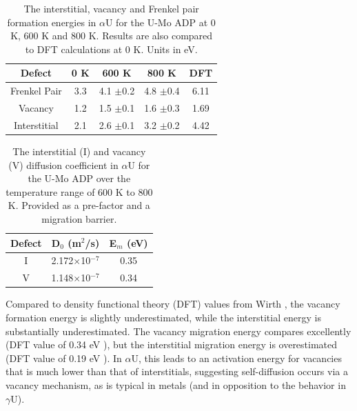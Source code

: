 \documentclass[review]{elsarticle}
\begin{document}
\begin{table}[h]
\caption{The interstitial, vacancy and Frenkel pair formation energies in $\alpha$U for the U-Mo ADP at 0 K, 600 K and 800 K. Results are also compared to DFT calculations at 0 K. Units in eV.} \label{tab:alphadef}
\begin{center}
\begin{tabular}{|c|c|c|c|c|}
	\hline
	Defect & 0 K & 600 K & 800 K & DFT\cite{wirth2011}\\
	 \hline
	Frenkel Pair	& 3.3 & 4.1 $\pm$0.2 & 4.8 $\pm$0.4 & 6.11\\
	Vacancy		& 1.2 & 1.5 $\pm$0.1 & 1.6 $\pm$0.3 & 1.69\\
	Interstitial		& 2.1 & 2.6 $\pm$0.1 & 3.2 $\pm$0.2 & 4.42\\
	\hline
\end{tabular}
\end{center}
\label{default}
\end{table}

\begin{table}[h]
\caption{The interstitial (I) and vacancy (V) diffusion coefficient in $\alpha$U for the U-Mo ADP over the temperature range of 600 K to 800 K. Provided as a pre-factor and a migration barrier.} \label{tab:alphadiff}
\begin{center}
\begin{tabular}{|c|c|c|}
	\hline
	Defect & D$_{0}$ (m$^{2}$/s) & E$_{m}$ (eV)\\
	 \hline
	 I & 2.172$\times$10$^{-7}$ & 0.35 \\
	 V & 1.148$\times$10$^{-7}$ & 0.34 \\
	\hline
\end{tabular}
\end{center}
\label{default}
\end{table}

\FloatBarrier

Compared to density functional theory (DFT) values from Wirth \cite{wirth2011}, the vacancy formation energy is slightly underestimated, while the interstitial energy is substantially underestimated. The vacancy migration energy compares excellently (DFT value of 0.34 eV \cite{wirth2011}), but the interstitial migration energy is overestimated (DFT value of 0.19 eV \cite{wirth2011}). In $\alpha$U, this leads to an activation energy for vacancies that is much lower than that of interstitials, suggesting self-diffusion occurs via a vacancy mechanism, as is typical in metals (and in opposition to the behavior in $\gamma$U). 
\end{document}
